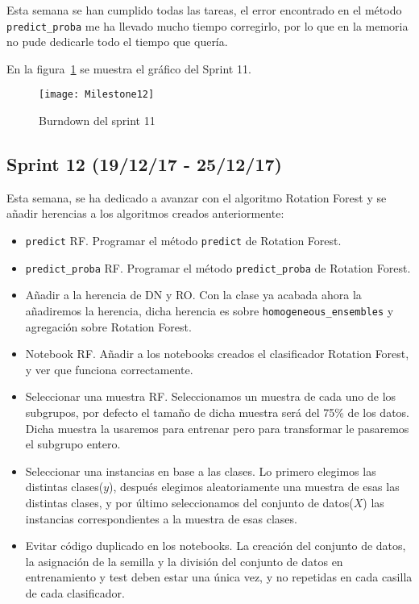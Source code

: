 Esta semana se han cumplido todas las tareas, el error encontrado en el método \texttt{predict\_proba} me ha llevado mucho tiempo corregirlo, por lo que en la memoria no pude dedicarle todo el tiempo que quería.

En la figura~\ref{fig:Milestone12} se muestra el gráfico del Sprint 11.

\begin{figure}
\centering
\texttt{[image: Milestone12]}
\caption{Burndown del sprint 11}
\label{fig:Milestone12}
\end{figure}

\subsection{Sprint 12 (19/12/17 - 25/12/17)}
Esta semana, se ha dedicado a avanzar con el algoritmo Rotation Forest y se añadir herencias a los algoritmos creados anteriormente:
\begin{itemize}
\item \texttt{predict} RF. Programar el método \texttt{predict} de Rotation Forest.
\item \texttt{predict\_proba} RF. Programar el método \texttt{predict\_proba} de Rotation Forest.
\item Añadir a la herencia de DN y RO. Con la clase ya acabada ahora la añadiremos la herencia, dicha herencia es sobre \texttt{homogeneous\_ensembles} y agregación sobre Rotation Forest.
\item Notebook RF. Añadir a los notebooks creados el clasificador Rotation Forest, y ver que funciona correctamente.
\item Seleccionar una muestra RF. Seleccionamos un muestra de cada uno de los subgrupos, por defecto el tamaño de dicha muestra será del 75\% de los datos. Dicha muestra la usaremos para entrenar pero para transformar le pasaremos el subgrupo entero.
\item Seleccionar una instancias en base a las clases. Lo primero elegimos las distintas clases($y$), después elegimos aleatoriamente una muestra de esas las distintas clases, y por último seleccionamos del conjunto de datos($X$) las instancias correspondientes a la muestra de esas clases.
\item Evitar código duplicado en los notebooks. La creación del conjunto de datos, la asignación de la semilla y la división del conjunto de datos en entrenamiento y test deben estar una única vez, y no repetidas en cada casilla de cada clasificador.
\end{itemize}

